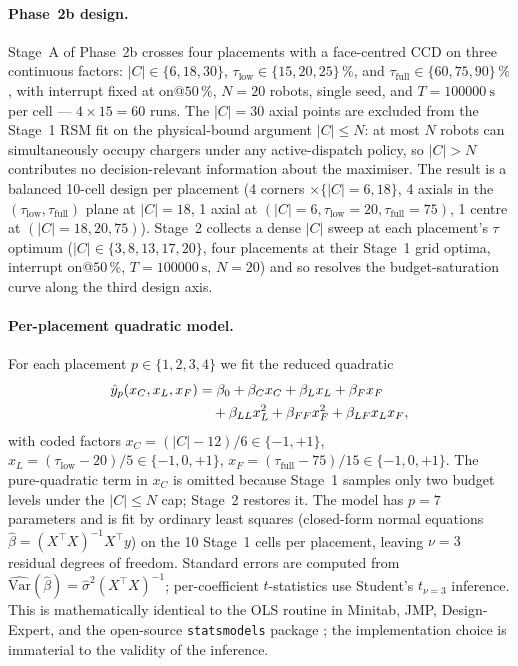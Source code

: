 \documentclass[conference]{IEEEtran}
\begin{document}
\paragraph{Phase~2b design.}
Stage~A of Phase~2b crosses four placements with a face-centred CCD on three continuous factors: $|C| \in \{6, 18, 30\}$, $\tau_\text{low} \in \{15, 20, 25\}\,\%$, and $\tau_\text{full} \in \{60, 75, 90\}\,\%$, with interrupt fixed at on@$50\,\%$, $N = 20$ robots, single seed, and $T = \SI{100000}{\second}$ per cell --- $4 \times 15 = 60$ runs. The $|C| = 30$ axial points are excluded from the Stage~1 RSM fit on the physical-bound argument $|C| \le N$: at most $N$ robots can simultaneously occupy chargers under any active-dispatch policy, so $|C| > N$ contributes no decision-relevant information about the maximiser. The result is a balanced 10-cell design per placement (4 corners $\times \{|C|=6,18\}$, 4 axials in the $(\tau_\text{low}, \tau_\text{full})$ plane at $|C|=18$, 1 axial at $(|C|=6, \tau_\text{low}=20, \tau_\text{full}=75)$, 1 centre at $(|C|=18, 20, 75)$). Stage~2 collects a dense $|C|$ sweep at each placement's $\tau$ optimum ($|C| \in \{3, 8, 13, 17, 20\}$, four placements at their Stage~1 grid optima, interrupt on@$50\,\%$, $T = \SI{100000}{\second}$, $N = 20$) and so resolves the budget-saturation curve along the third design axis.

\paragraph{Per-placement quadratic model.}
For each placement $p \in \{1, 2, 3, 4\}$ we fit the reduced quadratic
\begin{align}
  \hat{y}_p(x_C, x_L, x_F)
    &= \beta_0 + \beta_C x_C + \beta_L x_L + \beta_F x_F \notag\\
    &\quad + \beta_{LL} x_L^2 + \beta_{FF} x_F^2 + \beta_{LF} x_L x_F,
\end{align}
with coded factors $x_C = (|C| - 12)/6 \in \{-1, +1\}$, $x_L = (\tau_\text{low} - 20)/5 \in \{-1, 0, +1\}$, $x_F = (\tau_\text{full} - 75)/15 \in \{-1, 0, +1\}$. The pure-quadratic term in $x_C$ is omitted because Stage~1 samples only two budget levels under the $|C| \le N$ cap; Stage~2 restores it. The model has $p = 7$ parameters and is fit by ordinary least squares (closed-form normal equations $\hat\beta = (X^\top X)^{-1} X^\top y$) on the 10 Stage~1 cells per placement, leaving $\nu = 3$ residual degrees of freedom. Standard errors are computed from $\widehat{\mathrm{Var}}(\hat\beta) = \hat\sigma^2 (X^\top X)^{-1}$; per-coefficient $t$-statistics use Student's $t_{\nu=3}$ inference. This is mathematically identical to the OLS routine in Minitab, JMP, Design-Expert, and the open-source \texttt{statsmodels} package \cite{seabold2010}; the implementation choice is immaterial to the validity of the inference.
\end{document}
